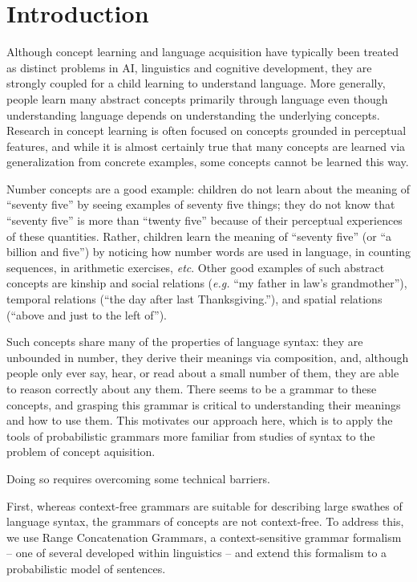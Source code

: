 \documentclass{article} %
\begin{document}
\section{Introduction}

Although concept learning and language acquisition have typically been
treated as distinct problems in AI, linguistics and cognitive
development, they are strongly coupled for a child learning to
understand language. More generally, people learn many abstract
concepts primarily through language even though understanding language
depends on understanding the underlying concepts. Research in concept
learning is often focused on concepts grounded in perceptual features,
and while it is almost certainly true that many concepts are learned
via generalization from concrete examples, some concepts cannot be
learned this way.

Number concepts are a good example: children do not learn about the
meaning of ``seventy five'' by seeing examples of seventy five things;
they do not know that ``seventy five'' is more than ``twenty five''
because of their perceptual experiences of these quantities. Rather,
children learn the meaning of ``seventy five'' (or ``a billion and
five'') by noticing how number words are used in language, in counting
sequences, in arithmetic exercises, {\it etc}. Other good examples of such
abstract concepts are kinship and social relations ({\it e.g.} ``my father
in law's grandmother''), temporal relations (``the day after last
Thanksgiving.''), and spatial relations (``above and just to the left
of'').

Such concepts share many of the properties of
language syntax: they are unbounded in number, they derive
their meanings via composition, and, although people only ever say,
hear, or read about a small number of them, they are able to reason
correctly about any them. There seems to be a grammar to these
concepts, and grasping this grammar is critical to understanding their
meanings and how to use them. This motivates our approach here, which
is to apply the tools of probabilistic grammars more familiar from
studies of syntax to the problem of concept aquisition.

Doing so requires overcoming some technical barriers.

First, whereas context-free grammars are suitable for describing large
swathes of language syntax, the grammars of concepts are not
context-free. To address this, we use Range Concatenation Grammars, a
context-sensitive grammar formalism -- one of several developed within
linguistics -- and extend this formalism to a probabilistic model of
sentences. 
\end{document}
